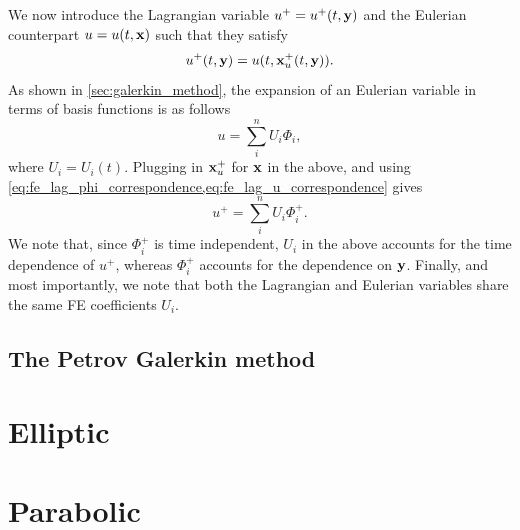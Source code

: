 \documentclass[oneside,a4paper,11pt]{report}
\begin{document}
We now introduce the Lagrangian variable $u^+ = u^+(t,\mathbf{y})$ and the Eulerian counterpart $u = u(t,\mathbf{x})$ such that they satisfy
\begin{equation}
    \label{eq:fe_lag_u_correspondence}
    u^+(t,\mathbf{y}) = u(t,\mathbf{x}_u^+(t,\mathbf{y})).
\end{equation}
As shown in \cref{sec:galerkin_method}, the expansion of an Eulerian variable in terms of basis functions is as follows
\begin{equation}
    u = \sum_i^n U_i \Phi_i,
\end{equation}
where $U_i = U_i(t)$. Plugging in $\mathbf{x}_u^+$ for $\mathbf{x}$ in the above, and using \cref{eq:fe_lag_phi_correspondence,eq:fe_lag_u_correspondence} gives
\begin{equation}
    u^+ = \sum_i^n U_i \Phi_i^+.
\end{equation}
We note that, since $\Phi_i^+$ is time independent, $U_i$ in the above accounts for the time dependence of $u^+$, whereas $\Phi_i^+$ accounts for the dependence on $\mathbf{y}$. Finally, and most importantly, we note that both the Lagrangian and Eulerian variables share the same FE coefficients $U_i$.


\section{The Petrov Galerkin method}

\chapter{Elliptic}

\chapter{Parabolic}

\end{document}
